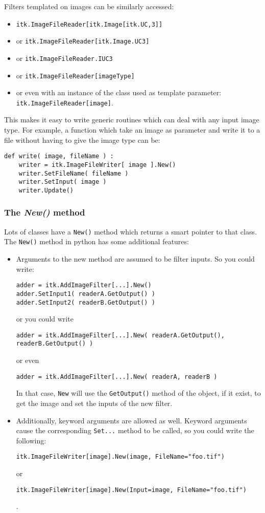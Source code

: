 \documentclass{InsightArticle}
\begin{document}
Filters templated on images can be similarly accessed:
\begin{itemize}
  \item \verb$itk.ImageFileReader[itk.Image[itk.UC,3]]$
  \item or \verb$itk.ImageFileReader[itk.Image.UC3]$
  \item or \verb$itk.ImageFileReader.IUC3$
  \item or \verb$itk.ImageFileReader[imageType]$
  \item or even with an instance of the class used as template parameter: \verb$itk.ImageFileReader[image]$.
\end{itemize}
This makes it easy to write generic routines which
can deal with any input image type. For example, a function which take an image
as parameter and write it to a file without having to give the image type can be:
\begin{verbatim}
def write( image, fileName ) :
    writer = itk.ImageFileWriter[ image ].New()
    writer.SetFileName( fileName )
    writer.SetInput( image )
    writer.Update()
\end{verbatim}


     \subsubsection{The {\em New()} method}

Lots of classes have a \verb$New()$ method which returns a smart pointer to that class. The
\verb$New()$ method in python has some additional features:
\begin{itemize}
  \item Arguments to the new method are assumed to be filter inputs. So you could
write:
\begin{verbatim}
adder = itk.AddImageFilter[...].New()
adder.SetInput1( readerA.GetOutput() )
adder.SetInput2( readerB.GetOutput() )
\end{verbatim}
or you could write
\begin{verbatim}
adder = itk.AddImageFilter[...].New( readerA.GetOutput(), readerB.GetOutput() )
\end{verbatim}
or even
\begin{verbatim}
adder = itk.AddImageFilter[...].New( readerA, readerB )
\end{verbatim}
In that case, \verb$New$ will use the \verb$GetOutput()$ method of the object, if it
exist, to get the image and set the inputs of the new filter.

  \item Additionally, keyword arguments are allowed as well. Keyword arguments cause
the corresponding \verb$Set...$ method to be called, so you could write the
following:
\begin{verbatim}
itk.ImageFileWriter[image].New(image, FileName="foo.tif")
\end{verbatim}
or
\begin{verbatim}
itk.ImageFileWriter[image].New(Input=image, FileName="foo.tif")
\end{verbatim}.

\end{itemize}
\end{document}
